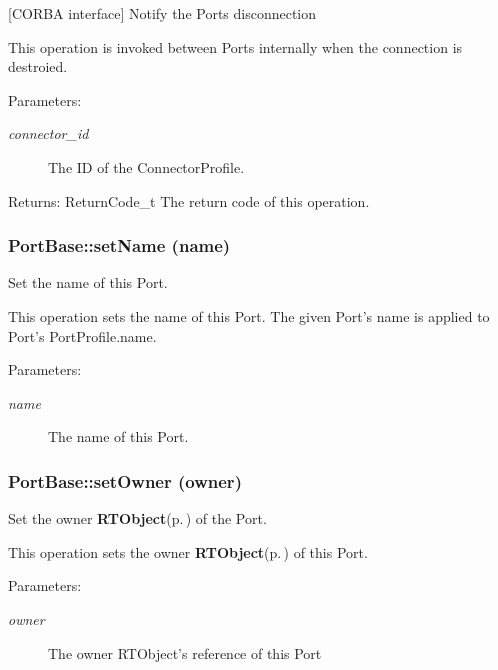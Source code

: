 [CORBA interface] Notify the Ports disconnection 

This operation is invoked between Ports internally when the connection is destroied.

\begin{Desc}
\item[Parameters:]
\begin{description}
\item[{\em connector\_\-id}]The ID of the Connector\-Profile. \end{description}
\end{Desc}
\begin{Desc}
\item[Returns:]Return\-Code\_\-t The return code of this operation.\end{Desc}
\subsubsection{\setlength{\rightskip}{0pt plus 5cm}Port\-Base::set\-Name (name)}\label{classPortBase_PortBasea10}


Set the name of this Port. 

This operation sets the name of this Port. The given Port's name is applied to Port's Port\-Profile.name.

\begin{Desc}
\item[Parameters:]
\begin{description}
\item[{\em name}]The name of this Port.\end{description}
\end{Desc}
\subsubsection{\setlength{\rightskip}{0pt plus 5cm}Port\-Base::set\-Owner (owner)}\label{classPortBase_PortBasea14}


Set the owner {\bf RTObject}{\rm (p.\,\pageref{namespaceRTObject})} of the Port. 

This operation sets the owner {\bf RTObject}{\rm (p.\,\pageref{namespaceRTObject})} of this Port.

\begin{Desc}
\item[Parameters:]
\begin{description}
\item[{\em owner}]The owner RTObject's reference of this Port\end{description}
\end{Desc}

